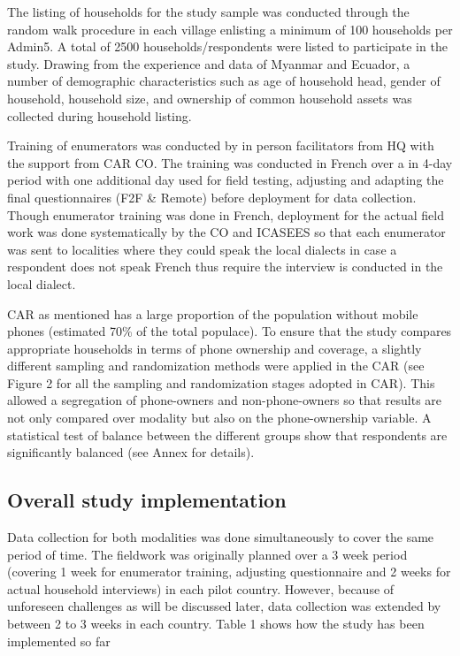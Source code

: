 \documentclass[11pt,harvard]{article}
\begin{document}
The listing of households for the study sample was conducted through the random walk procedure in each village enlisting a minimum of 100 households per Admin5. A total of 2500 households/respondents were listed to participate in the study. Drawing from the experience and data of Myanmar and Ecuador, a number of demographic characteristics such as age of household head, gender of household, household size, and ownership of common household assets was collected during household listing.
 
Training of enumerators was conducted by in person facilitators from HQ with the support from CAR CO. The training was conducted in French over a in 4-day period with one additional day used for field testing, adjusting and adapting the final questionnaires (F2F \& Remote) before deployment for data collection. Though enumerator training was done in French, deployment for the actual field work was done systematically by the CO and ICASEES so that each enumerator was sent to localities where they could speak the local dialects in case a respondent does not speak French thus require the interview is conducted in the local dialect.

CAR as mentioned has a large proportion of the population without mobile phones (estimated 70\% of the total populace). To ensure that the study compares appropriate households in terms of phone ownership and coverage, a slightly different sampling and randomization methods were applied in the CAR (see Figure 2 for all the sampling and randomization stages adopted in CAR). This allowed a segregation of phone-owners and non-phone-owners so that results are not only compared over modality but also on the phone-ownership variable. A statistical test of balance between the different groups show that respondents are significantly balanced (see Annex for details).

	\subsection{Overall study implementation}

Data collection for both modalities was done simultaneously to cover the same period of time. The fieldwork was originally planned over a 3 week period (covering 1 week for enumerator training, adjusting questionnaire and 2 weeks for actual household interviews) in each pilot country. However, because of unforeseen challenges as will be discussed later, data collection was extended by between 2 to 3 weeks in each country. Table 1 shows how the study has been implemented so far
\end{document}
